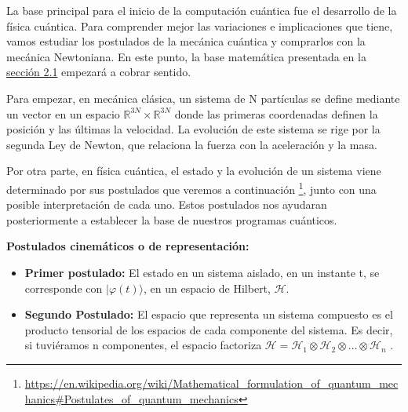 La base principal para el inicio de la computación cuántica fue el desarrollo de la física cuántica. Para comprender mejor las variaciones e implicaciones que tiene, vamos estudiar los postulados de la mecánica cuántica y comprarlos con la mecánica Newtoniana. En este punto, la base matemática presentada en la \hyperref[Sec2.1:Matematicas]{sección 2.1} empezará a cobrar sentido.

\vspace{5pt}

Para empezar, en mecánica clásica, un sistema de N partículas se define mediante un vector en un espacio $\mathbb{R}^{3N} \times \mathbb{R}^{3N}$ donde las primeras coordenadas definen la posición y las últimas la velocidad. La evolución de este sistema se rige por la segunda Ley de Newton, que relaciona la fuerza con la aceleración y la masa.

\vspace{5pt}

Por otra parte, en física cuántica, el estado y la evolución de un sistema viene determinado por sus postulados \cite{B:Nielsen:2002}\cite{Note:Martin} que veremos a continuación \footnote{\url{https://en.wikipedia.org/wiki/Mathematical_formulation_of_quantum_mechanics\#Postulates_of_quantum_mechanics}}, junto con una posible interpretación de cada uno. Estos postulados nos ayudaran posteriormente a establecer la base de nuestros programas cuánticos.
\vspace{10pt}

\textbf{Postulados cinemáticos o de representación:}
\begin{itemize}
    \item \textbf{Primer postulado:}\label{Postulado1} El estado en un sistema aislado, en un instante t, se corresponde con $| \varphi (t) \rangle$, en un espacio de Hilbert, $\mathscr{H}$.
    
    \item \textbf{Segundo Postulado:}\label{Postulado2} El espacio que representa un sistema compuesto es el producto tensorial de los espacios de cada componente del sistema. Es decir, si tuviéramos n componentes, el espacio factoriza $\mathscr{H}=\mathscr{H}_{1}\otimes\mathscr{H}_{2}\otimes...\otimes\mathscr{H}_{n}$ .
\end{itemize}

